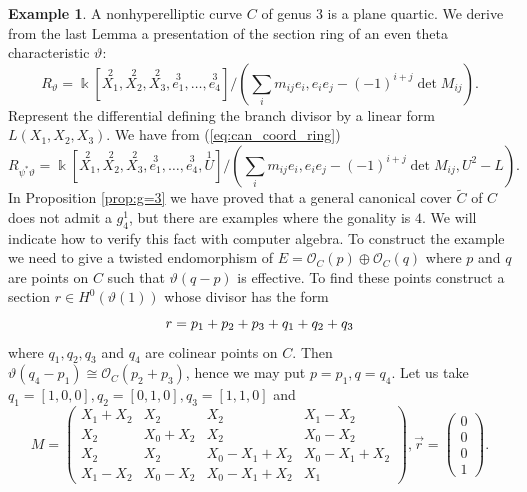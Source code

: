 \documentclass[12pt]{extarticle}
\theoremstyle{definition}
\newtheorem{example}[theorem]{Example}
\numberwithin{theorem}{section}
\newcommand{\OO}{\mathcal{O}}
\newcommand{\op}{\operatorname}
\renewcommand{\tilde}{\widetilde}		%
\let\div\relax							%
\DeclareMathOperator{\div}{div}
\begin{document}
\begin{example}
A nonhyperelliptic curve $C$ of genus $3$ is a plane quartic.  We derive from the last Lemma a presentation of the section ring of an even theta characteristic $\vartheta$:
\begin{equation*}
R_{\vartheta} =  \Bbbk[\overset{2}{X_1},\overset{2}{X_2},\overset{2}{X_3},\overset{3}{e_1},\ldots,\overset{3}{e_4}]/(\sum_i m_{ij}e_i, e_ie_j - (-1)^{i+j}\op{det}M_{ij}). 
\end{equation*}
Represent the differential defining the branch divisor by a linear form $L(X_1,X_2,X_3)$. We have from (\ref{eq:can_coord_ring})
\begin{equation*}
R_{\psi^*\vartheta} =  \Bbbk[\overset{2}{X_1},\overset{2}{X_2},\overset{2}{X_3},\overset{3}{e_1},\ldots,\overset{3}{e_4},\overset{1}{U}]/(\sum_i m_{ij}e_i, e_ie_j - (-1)^{i+j}\op{det}M_{ij},U^2 - L). 
\end{equation*}
In Proposition \ref{prop:g=3} we have proved that a general canonical cover $\tilde{C} $ of $C$ does not admit a $g^1_4$, but there are examples where the gonality is $4$. We will indicate how to verify this fact with computer algebra. To construct the example we need to give a twisted endomorphism of $E = \OO_C(p) \oplus \OO_C(q)$ where $p$ and $q$ are points on $C$ such that $\vartheta(q-p)$ is effective. To find these points construct a section $r \in H^0(\vartheta(1))$ whose divisor has the form
\begin{equation}
\div r = p_1 + p_2 + p_3 + q_1 + q_2 + q_3 
\end{equation} 
where $q_1,q_2,q_3$ and $q_4$ are colinear points on $C$. Then $\vartheta(q_4 - p_1) \cong \OO_C(p_2 + p_3)$, hence we may put $p = p_1, q = q_4$. Let us take $q_1 = [1,0,0],q_2 = [0,1,0],q_3 = [1,1,0]$ and 
\begin{equation*}
M = \begin{pmatrix}
X_1 + X_2 & X_2 & X_2 & X_1 - X_2\\
X_2 & X_0 + X_2 & X_2 & X_0 - X_2 \\
X_2 & X_2 & X_0 - X_1 + X_2 & X_0 - X_1 + X_2 \\
X_1 - X_2 & X_0 - X_2 & X_0 - X_1 + X_2 & X_1
\end{pmatrix}
, \vec{r} = \begin{pmatrix}
0 \\ 0 \\ 0 \\ 1
\end{pmatrix}.
\end{equation*}

\end{example}
\end{document}
